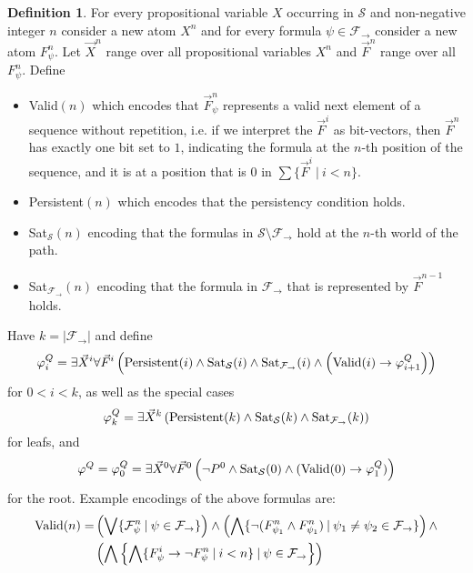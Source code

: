 \documentclass[a4paper,12pt]{report}
\theoremstyle{definition}
\theoremstyle{definition}
\theoremstyle{definition}
\theoremstyle{definition}
\theoremstyle{definition}
\newtheorem{definition}[theorem]{Definition}
\theoremstyle{definition}
\theoremstyle{definition}
\begin{document}
	\begin{definition}
		For every propositional variable $X$ occurring in $\mathcal S$ and non-negative integer $n$ consider a new atom $X^n$ and for every formula $\psi\in\mathcal F_\to$ consider a new atom $F_\psi^n$. Let $\vec X^n$ range over all propositional variables $X^n$ and $\vec F^n$ range over all $F_\psi^n$. Define
		\begin{itemize}
			\item {\normalfont Valid}$(n)$ which encodes that $\vec F^n_\psi$ represents a valid next element of a sequence without repetition, i.e. if we interpret the $\vec F^i$ as bit-vectors, then $\vec F^n$ has exactly one bit set to $1$, indicating the formula at the $n$-th position of the sequence, and it is at a position that is $0$ in $\sum\{\vec F^i\:|\:i < n\}$.
			\item {\normalfont Persistent}$(n)$ which encodes that the persistency condition holds.
			\item {\normalfont Sat}$_{\mathcal S}(n)$ encoding that the formulas in $\mathcal S\setminus\mathcal F_\to$ hold at the $n$-th world of the path.
			\item {\normalfont Sat}$_{\mathcal F_\to}(n)$ encoding that the formula in $\mathcal F_\to$ that is represented by $\vec F^{n-1}$ holds.
		\end{itemize}
		Have $k = |\mathcal F_\to|$ and define$$\varphi^Q_{i} = \exists \vec X^i\forall \vec F^i\left(\text{\normalfont Persistent}(i)\wedge \text{\normalfont Sat}_{\mathcal S}(i)\wedge \text{\normalfont Sat}_{\mathcal F_\to}(i)\wedge\left(\text{\normalfont Valid}(i)\to \varphi^Q_{i+1}\right)\right)$$
		for $0 < i < k$, as well as the special cases
		$$\varphi^Q_{k} = \exists \vec X^k\left(\text{\normalfont Persistent}(k)\wedge \text{\normalfont Sat}_{\mathcal S}(k)\wedge \text{\normalfont Sat}_{\mathcal F_\to}(k)\right)$$
		for leafs, and $$\varphi^Q = \varphi_0^Q = \exists \vec X^0\forall \vec F^0\left(\neg P^0\wedge \text{\normalfont Sat}_{\mathcal S}(0)\wedge(\text{\normalfont Valid}(0)\to \varphi_1^Q)\right)$$for the root.
		Example encodings of the above formulas are:
		\begin{align*}
			\text{\normalfont Valid}(n) = &\left(\bigvee \{\mathcal F^n_\psi\:|\:\psi\in\mathcal F_\to\}\right)\wedge\left(\bigwedge \{\neg(F^n_{\psi_1}\wedge F^n_{\psi_1})\:|\:\psi_1\neq\psi_2\in\mathcal F_\to\}\right)\wedge\\&\left(\bigwedge\left\{\bigwedge\{F^i_\psi\to\neg F^n_\psi\:|\:i < n\}\:|\:\psi\in\mathcal F_\to\right\}\right)\\

\end{align*}
\end{definition}
\end{document}
